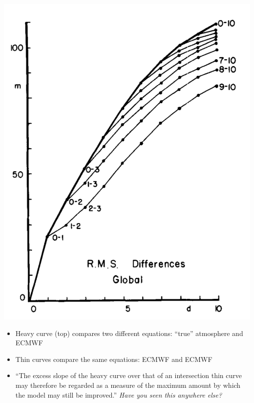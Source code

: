 \documentclass[aspectratio=169]{beamer}
\begin{document}
\begin{frame}

\begin{center}
\includegraphics[height = 0.6\textheight]{figures/lorenz_atmospheric_1982_fig1}
\end{center}

\begin{itemize}
\item Heavy curve (top) compares two different equations: ``true'' atmosphere and ECMWF
\pause
\item Thin curves compare the same equations: ECMWF and ECMWF
\pause
\item ``The excess slope of the heavy curve over that of an intersection thin curve may therefore be regarded as a measure of the maximum amount by which the model may still be improved.''  \emph{Have you seen this anywhere else?}
\end{itemize}

\end{frame}
\end{document}
